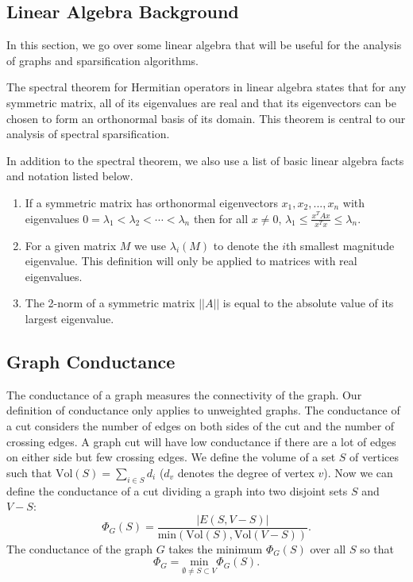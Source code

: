 \documentclass[12pt,twoside]{article}
\begin{document}
\subsection{Linear Algebra Background} 

In this section, we go over some linear algebra that will be useful for the analysis of graphs and sparsification algorithms.

The spectral theorem for Hermitian operators in linear algebra states that for any symmetric matrix, all of its eigenvalues are real and that its eigenvectors can be chosen to form an orthonormal basis of its domain. This theorem is central to our analysis of spectral sparsification.

In addition to the spectral theorem, we also use a list of basic linear algebra facts and notation listed below.

\begin{enumerate}
    \item If a symmetric matrix has orthonormal eigenvectors $x_1, x_2, ... , x_n$ with eigenvalues $0 = \lambda_1 < \lambda_2 < \cdots  < \lambda_n$ then for all $x \neq 0$, $\lambda_1 \leq \frac{x^TAx}{x^Tx} \leq \lambda_n$.
    \item For a given matrix $M$ we use $\lambda_i(M)$ to denote the $i$th smallest magnitude eigenvalue. This definition will only be applied to matrices with real eigenvalues.
    \item The 2-norm of a symmetric matrix $||A||$ is equal to the absolute value of its largest eigenvalue.
\end{enumerate}


\subsection{Graph Conductance}

The conductance of a graph measures the connectivity of the graph. Our definition of conductance only applies to unweighted graphs. The conductance of a cut considers the number of edges on both sides of the cut and the number of crossing edges. A graph cut will have low conductance if there are a lot of edges on either side but few crossing edges. We define the volume of a set $S$ of vertices such that $\text{Vol}(S)=\sum_{i\in S} d_i$  ($d_v$ denotes the degree of vertex $v$). Now we can define the conductance of a cut dividing a graph into two disjoint sets $S$ and $V-S$:
%
\begin{equation}
\label{eqn:conductance-def}
\Phi_G(S) = \frac{|E(S,V-S)|}{\text{min}(\text{Vol}(S),\text{Vol}(V-S))}.
\end{equation}
%
The conductance of the graph $G$ takes the minimum $\Phi_G(S)$ over all $S$ so that 
%
\begin{equation}
\Phi_G = \underset{\emptyset \not= S \subset V}{\text{min}} \Phi_G(S).
\end{equation}
\end{document}

